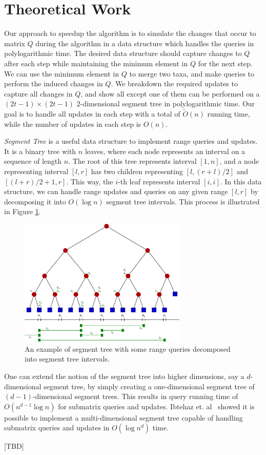 \section{Theoretical Work}

Our approach to speedup the algorithm is to simulate the changes that occur to matrix $Q$ during the algorithm in a data structure which handles the queries in polylogarithmic time. The desired data structure should capture changes to $Q$ after each step while maintaining the minimum element in $Q$ for the next step. We can use the minimum element in $Q$ to merge two taxa, and make queries to perform the induced changes in $Q$. We breakdown the required updates to capture all changes in $Q$, and show all except one of them can be performed on a $(2t-1) \times (2t-1)$ $2$-dimensional segment tree in polylogarithmic time. Our goal is to handle all updates in each step with a total of $\widetilde{O}(n)$ running time, while the number of updates in each step is $O(n)$.

\emph{Segment Tree} is a useful data structure to implement range queries and updates. It is a binary tree with $n$ leaves, where each node represents an interval on a sequence of length $n$. The root of this tree represents interval $[1, n]$, and a node representing interval $[l, r]$ has two children representing $[l, (r + l) / 2]$ and $[(l + r) / 2 + 1, r]$. This way, the $i$-th leaf represents interval $[i, i]$. In this data structure, we can handle range updates and queries on any given range $[l, r]$ by decomposing it into $O(\log{n})$ segment tree intervals. This process is illustrated in Figure \ref{segment-tree}.

\begin{figure}[h!]\label{segment-tree}
	\caption{An example of segment tree with some range queries decomposed into segment tree intervals.}
	\begin{center}
		\includegraphics[width=8cm]{Segment_tree.png}
	\end{center}
\end{figure}

One can extend the notion of the segment tree into higher dimensions, say a $d$-dimensional segment tree, by simply creating a one-dimensional segment tree of $(d-1)$-dimensional segment trees. This results in query running time of $O(n^{d-1}\log{n})$ for submatrix queries and updates. Ibtehaz et. al~\cite{ibtehaz2018multidimensional} showed it is possible to implement a multi-dimensional segment tree capable of handling submatrix queries and updates in $O(\log{n}^d)$ time.

[TBD]